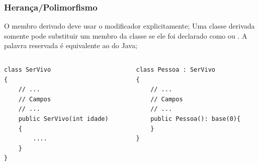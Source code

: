 \documentclass{beamer}
\begin{document}
\begin{frame}[fragile]
\frametitle{Herança/Polimorfismo}
\begin{outline}
	\1 O membro derivado deve usar o modificador  explicitamente;
	\1 Uma classe derivada somente pode substituir um membro da classe se ele foi declarado como  ou .
	\1 A palavra reservada  é equivalente ao  do Java;
		
\end{outline}
\begin{columns}[T]
	\begin{column}{0.5\textwidth}
\begin{lstlisting}	
class SerVivo
{
	// ...
	// Campos
	// ...
	public SerVivo(int idade)
	{
		....
	}	
}
\end{lstlisting}		
	\end{column}
	\begin{column}{0.5\textwidth}	
\begin{lstlisting}
class Pessoa : SerVivo
{
	// ...
	// Campos
	// ...
	public Pessoa(): base(0){
	}
}
\end{lstlisting}
	\end{column}
\end{columns}
\end{frame}
\end{document}
